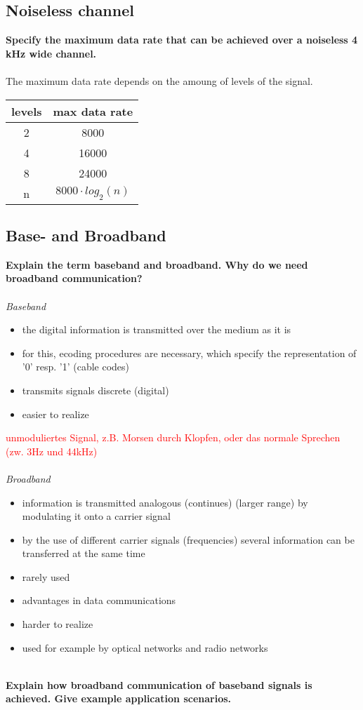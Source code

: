 \documentclass[a4paper,12pt]{article}
\begin{document}
\subsection{Noiseless channel}
\textbf{Specify the maximum data rate that can be achieved over a noiseless 4 kHz wide channel.}\\
\\
The maximum data rate depends on the amoung of levels of the signal. \\

\begin{minipage}{0.9\linewidth}
	\centering
	\begin{tabular}{|c|c|} \hline
		\textbf{levels} & \textbf{max data rate} \\ \hline
		2 & 8000 \\
		4 & 16000 \\
		8 & 24000 \\ \hline
		n & $8000 \cdot log_{2}(n)$ \\ \hline 
	\end{tabular}
\end{minipage}

\subsection{Base- and Broadband}
\textbf{Explain the term baseband and broadband. Why do we need broadband communication?}\\
\\
\textit{Baseband}
\begin{itemize}[itemsep=0pt]
	\item  the digital information is transmitted over the medium as it is
	\item  for this, ecoding procedures are necessary, which specify the representation of '0' resp. '1' (cable codes)
	\item  transmits signals discrete (digital)
	\item  easier to realize
\end{itemize}
\textcolor{red}{unmoduliertes Signal, z.B. Morsen durch Klopfen, oder das normale Sprechen (zw. 3Hz und 44kHz)}\\
~\\
\textit{Broadband}
\begin{itemize}[itemsep=0pt]
	\item  information is transmitted analogous (continues) (larger range) by modulating it onto a carrier signal
	\item  by the use of different carrier signals (frequencies) several information can be transferred at the same time
	\item  rarely used
	\item  advantages in data communications
	\item  harder to realize
	\item  used for example by optical networks and radio networks
\end{itemize}
~\\
\textbf{Explain how broadband communication of baseband signals is achieved. Give example application scenarios.}\\
\end{document}
